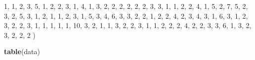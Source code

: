 \documentclass[
]{book}
\newenvironment{Shaded}{\begin{snugshade}}{\end{snugshade}}
\newcommand{\DecValTok}[1]{\textcolor[rgb]{0.00,0.00,0.81}{#1}}
\newcommand{\FunctionTok}[1]{\textcolor[rgb]{0.13,0.29,0.53}{\textbf{#1}}}
\newcommand{\NormalTok}[1]{#1}
\theoremstyle{definition}
\theoremstyle{definition}
\theoremstyle{definition}
\theoremstyle{definition}
\theoremstyle{remark}
\begin{document}
\begin{Shaded}
\begin{Highlighting}[]
  \DecValTok{1}\NormalTok{, }\DecValTok{1}\NormalTok{, }\DecValTok{2}\NormalTok{, }\DecValTok{3}\NormalTok{, }\DecValTok{5}\NormalTok{, }\DecValTok{1}\NormalTok{, }\DecValTok{2}\NormalTok{, }\DecValTok{2}\NormalTok{, }\DecValTok{3}\NormalTok{,  }\DecValTok{1}\NormalTok{, }\DecValTok{4}\NormalTok{, }\DecValTok{1}\NormalTok{, }\DecValTok{3}\NormalTok{, }\DecValTok{2}\NormalTok{,  }\DecValTok{2}\NormalTok{, }\DecValTok{2}\NormalTok{, }\DecValTok{2}\NormalTok{, }\DecValTok{2}\NormalTok{, }\DecValTok{2}\NormalTok{, }\DecValTok{3}\NormalTok{, }
  \DecValTok{3}\NormalTok{, }\DecValTok{1}\NormalTok{, }\DecValTok{1}\NormalTok{, }\DecValTok{2}\NormalTok{, }\DecValTok{2}\NormalTok{, }\DecValTok{4}\NormalTok{, }\DecValTok{1}\NormalTok{, }\DecValTok{5}\NormalTok{, }\DecValTok{2}\NormalTok{,  }\DecValTok{7}\NormalTok{, }\DecValTok{5}\NormalTok{, }\DecValTok{2}\NormalTok{, }\DecValTok{3}\NormalTok{, }\DecValTok{2}\NormalTok{,  }\DecValTok{5}\NormalTok{, }\DecValTok{3}\NormalTok{, }\DecValTok{1}\NormalTok{, }\DecValTok{2}\NormalTok{, }\DecValTok{1}\NormalTok{, }\DecValTok{1}\NormalTok{, }
  \DecValTok{2}\NormalTok{, }\DecValTok{3}\NormalTok{, }\DecValTok{1}\NormalTok{, }\DecValTok{5}\NormalTok{, }\DecValTok{3}\NormalTok{, }\DecValTok{4}\NormalTok{, }\DecValTok{6}\NormalTok{, }\DecValTok{3}\NormalTok{, }\DecValTok{3}\NormalTok{,  }\DecValTok{2}\NormalTok{, }\DecValTok{2}\NormalTok{, }\DecValTok{1}\NormalTok{, }\DecValTok{2}\NormalTok{, }\DecValTok{2}\NormalTok{,  }\DecValTok{4}\NormalTok{, }\DecValTok{2}\NormalTok{, }\DecValTok{3}\NormalTok{, }\DecValTok{4}\NormalTok{, }\DecValTok{3}\NormalTok{, }\DecValTok{1}\NormalTok{, }
  \DecValTok{6}\NormalTok{, }\DecValTok{3}\NormalTok{, }\DecValTok{1}\NormalTok{, }\DecValTok{2}\NormalTok{, }\DecValTok{3}\NormalTok{, }\DecValTok{2}\NormalTok{, }\DecValTok{2}\NormalTok{, }\DecValTok{3}\NormalTok{, }\DecValTok{1}\NormalTok{,  }\DecValTok{1}\NormalTok{, }\DecValTok{1}\NormalTok{, }\DecValTok{1}\NormalTok{, }\DecValTok{1}\NormalTok{, }\DecValTok{10}\NormalTok{, }\DecValTok{3}\NormalTok{, }\DecValTok{2}\NormalTok{, }\DecValTok{1}\NormalTok{, }\DecValTok{1}\NormalTok{, }\DecValTok{3}\NormalTok{, }\DecValTok{2}\NormalTok{, }
  \DecValTok{2}\NormalTok{, }\DecValTok{3}\NormalTok{, }\DecValTok{1}\NormalTok{, }\DecValTok{1}\NormalTok{, }\DecValTok{2}\NormalTok{, }\DecValTok{2}\NormalTok{, }\DecValTok{2}\NormalTok{, }\DecValTok{4}\NormalTok{, }\DecValTok{2}\NormalTok{,  }\DecValTok{2}\NormalTok{, }\DecValTok{3}\NormalTok{, }\DecValTok{3}\NormalTok{, }\DecValTok{6}\NormalTok{, }\DecValTok{1}\NormalTok{,  }\DecValTok{3}\NormalTok{, }\DecValTok{2}\NormalTok{, }\DecValTok{3}\NormalTok{, }\DecValTok{2}\NormalTok{, }\DecValTok{2}\NormalTok{, }\DecValTok{2}
\NormalTok{  )}

\FunctionTok{table}\NormalTok{(data)}
\end{Highlighting}
\end{Shaded}
\end{document}
